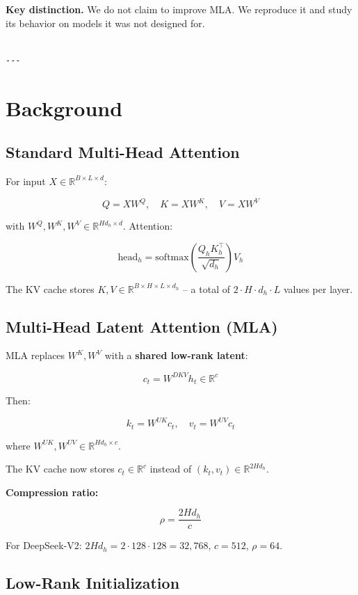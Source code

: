 \textbf{Key distinction.} We do not claim to improve MLA. We reproduce it and 
study its behavior on models it was not designed for.
\begin{lstlisting}

---
\end{lstlisting}


\section{Background}

\subsection{Standard Multi-Head Attention}

For input $X \in \mathbb{R}^{B \times L \times d}$:

\[
Q = X W^Q, \quad K = X W^K, \quad V = X W^V
\tag{3.1}
\]

with $W^Q, W^K, W^V \in \mathbb{R}^{H d_h \times d}$. Attention:

\[
\text{head}_h = \text{softmax}\!\left(\frac{Q_h K_h^\top}{\sqrt{d_h}}\right) V_h
\tag{3.2}
\]

The KV cache stores $K, V \in \mathbb{R}^{B \times H \times L \times d_h}$ -- 
a total of $2 \cdot H \cdot d_h \cdot L$ values per layer.

\subsection{Multi-Head Latent Attention (MLA)}

MLA replaces $W^K, W^V$ with a \textbf{shared low-rank latent}:

\[
c_t = W^{DKV} h_t \in \mathbb{R}^c
\tag{3.3}
\]

Then:

\[
k_t = W^{UK} c_t, \quad v_t = W^{UV} c_t
\tag{3.4}
\]

where $W^{UK}, W^{UV} \in \mathbb{R}^{H d_h \times c}$.

The KV cache now stores $c_t \in \mathbb{R}^c$ instead of $(k_t, v_t) \in \mathbb{R}^{2 H d_h}$.

\textbf{Compression ratio:}

\[
\rho = \frac{2 H d_h}{c}
\tag{3.5}
\]

For DeepSeek-V2: $2 H d_h = 2 \cdot 128 \cdot 128 = 32{,}768$, $c = 512$, 
$\rho = 64$.

\subsection{Low-Rank Initialization}

